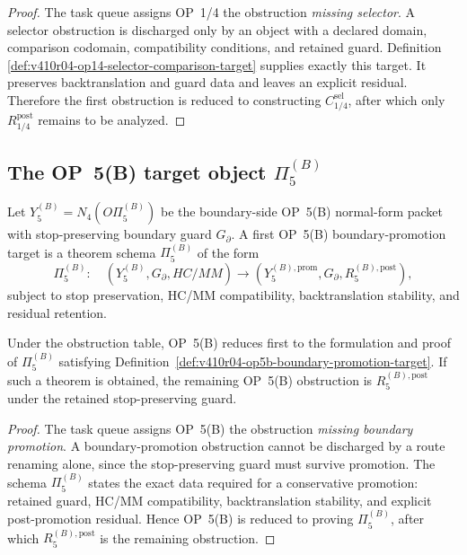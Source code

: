 \begin{proof}
The task queue assigns OP~1/4 the obstruction \emph{missing selector}. A
selector obstruction is discharged only by an object with a declared domain,
comparison codomain, compatibility conditions, and retained guard. Definition
\ref{def:v410r04-op14-selector-comparison-target} supplies exactly this target.
It preserves backtranslation and guard data and leaves an explicit residual.
Therefore the first obstruction is reduced to constructing $C_{1/4}^{\mathrm{sel}}$, after
which only $R_{1/4}^{\mathrm{post}}$ remains to be analyzed.
\end{proof}

\subsection{The OP~5(B) target object $\Pi_{5}^{(B)}$}
\label{subsec:v410r04-op5b-target-object}

\begin{definition}
\label{def:v410r04-op5b-boundary-promotion-target}
Let $Y_{5}^{(B)}=N_4(O\Pi_{5}^{(B)})$ be the boundary-side OP~5(B) normal-form packet with
stop-preserving boundary guard $G_{\partial}$. A first OP~5(B)
boundary-promotion target is a theorem schema $\Pi_{5}^{(B)}$ of the form
\[
 \Pi_{5}^{(B)}:\quad
 (Y_{5}^{(B)},G_{\partial},HC/MM)\longrightarrow
 (Y_{5}^{(B),\mathrm{prom}},G_{\partial},R_{5}^{(B),\mathrm{post}}),
\]
subject to stop preservation, HC/MM compatibility, backtranslation stability,
and residual retention.
\end{definition}

\begin{proposition}
\label{prop:v410r04-op5b-task-object-reduction}
Under the obstruction table, OP~5(B) reduces first to the formulation and
proof of $\Pi_{5}^{(B)}$ satisfying Definition~\ref{def:v410r04-op5b-boundary-promotion-target}.
If such a theorem is obtained, the remaining OP~5(B) obstruction is
$R_{5}^{(B),\mathrm{post}}$ under the retained stop-preserving guard.
\end{proposition}

\begin{proof}
The task queue assigns OP~5(B) the obstruction \emph{missing boundary
promotion}. A boundary-promotion obstruction cannot be discharged by a route
renaming alone, since the stop-preserving guard must survive promotion. The
schema $\Pi_{5}^{(B)}$ states the exact data required for a conservative promotion:
retained guard, HC/MM compatibility, backtranslation stability, and explicit
post-promotion residual. Hence OP~5(B) is reduced to proving $\Pi_{5}^{(B)}$, after
which $R_{5}^{(B),\mathrm{post}}$ is the remaining obstruction.
\end{proof}

